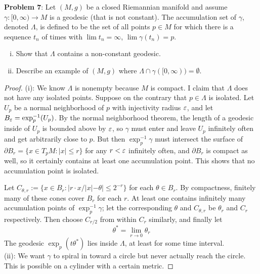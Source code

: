 \documentclass{amsart}
\begin{document}
	\newpage
	\textbf{Problem 7}: Let $(M,g)$ be a closed Riemannian manifold and assume $\gamma:[0,\infty)\to M$ is a geodesic (that is not constant). The accumulation set of $\gamma$, denoted $\Lambda$, is defined to be the set of all points $p\in M$ for which there is a sequence $t_n$ of times with $\lim t_n=\infty$, $\lim \gamma(t_n)=p$.
	\begin{enumerate}[(i)]
		\item Show that $\Lambda$ contains a non-constant geodesic.
		\item Describe an example of $(M,g)$ where $\Lambda\cap \gamma([0,\infty))=\emptyset$.
	\end{enumerate}
	\begin{proof}
		(i): We know $\Lambda$ is nonempty because $M$ is compact. I claim that $\Lambda$ does not have any isolated points. Suppose on the contrary that $p\in \Lambda$ is isolated. Let $U_{p}$ be a normal neighborhood of $p$ with injectivity radius $\varepsilon$, and let $B_{\varepsilon}=\exp_p^{-1}(U_p)$. By the normal neighborhood theorem, the length of a geodesic inside of $U_p$ is bounded above by $\varepsilon$, so $\gamma$ must enter and leave $U_p$ infinitely often and get arbitrarily close to $p$. But then $\exp_p^{-1}\gamma$ must intersect the surface of $\partial B_r = \{x\in T_pM: |x|\leq r\}$ for any $r<\varepsilon$ infinitely often, and $\partial B_r$ is compact as well, so it certainly contains at least one accumulation point. This shows that no accumulation point is isolated.
		
		Let $C_{\theta,r} := \{x\in B_r : |r\cdot x/|x| - \theta|\leq 2^{-r}\}$ for each $\theta\in B_r$. By compactness, finitely many of these cones cover $B_r$ for each $r$. At least one contains infinitely many accumulation points of $\exp_p^{-1}\gamma$; let the corresponding $\theta$ and $C_{\theta,r}$ be $\theta_r$ and $C_r$ respectively. Then choose $C_{r/2}$ from within $C_r$ similarly, and finally let
		$$
		\theta^* = \lim_{r\to 0} \theta_r
		$$
		The geodesic $\exp_p(t\theta^*)$ lies inside $\Lambda$, at least for some time interval.\\
		
		(ii): We want $\gamma$ to spiral in toward a circle but never actually reach the circle. This is possible on a cylinder with a certain metric. 
	\end{proof}
\end{document}

